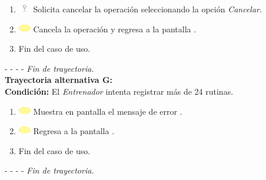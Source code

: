 \begin{enumerate}
	\item \includegraphics[width=15pt, height=10pt]{./Figuras/iconosCU/usuario.png} Solicita cancelar la operación seleccionando la opción \textit{Cancelar}.
	\item \includegraphics[width=15pt]{./Figuras/iconosCU/herramienta.png} Cancela la operación y regresa a la pantalla .
	\item Fin del caso de uso.
\end{enumerate}

- - - - \textit{Fin de trayectoria.} \\

\textbf{\large{Trayectoria alternativa G:}}\\
\textbf{Condición: } El \textit{Entrenador} intenta registrar más de 24 rutinas.

\begin{enumerate}
	\item \includegraphics[width=15pt]{./Figuras/iconosCU/herramienta.png} Muestra en pantalla el mensaje de error .
	\item \includegraphics[width=15pt]{./Figuras/iconosCU/herramienta.png} Regresa a la pantalla .
	\item Fin del caso de uso.
\end{enumerate}

- - - - \textit{Fin de trayectoria.} \\

\clearpage